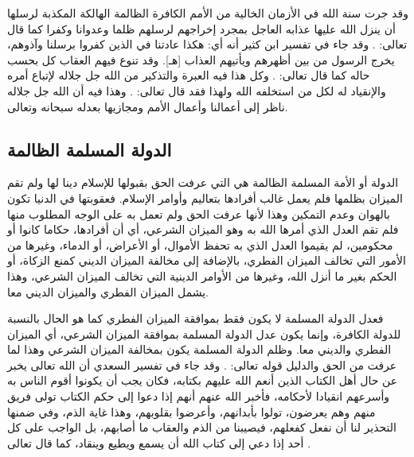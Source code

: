 وقد جرت سنة الله في الأزمان الخالية من الأمم الكافرة الظالمة الهالكة المكذبة لرسلها أن ينزل الله عليها عذابه العاجل بمجرد إخراجهم لرسلهم ظلما وعدوانا وكفرا كما قال تعالى:  
\quranayah*[17][77]{\footnotesize \surahname*[17]}. وقد جاء في تفسير ابن كثير أنه أي: هكذا عادتنا في الذين كفروا برسلنا وآذوهم، يخرج الرسول من بين أظهرهم ويأتيهم العذاب [هـ]. وقد تنوع فيهم العقاب كل بحسب حاله كما قال تعالى: 
\quranayah*[29][40]{\footnotesize \surahname*[29]}. وكل هذا فيه العبرة والتذكير من الله جل جلاله لإتباع أمره والإنقياد له لكل من استخلفه الله ولهذا فقد قال تعالى:
\quranayah*[10][13-14]{\footnotesize \surahname*[10]}.
وهذا فيه أن الله جل جلاله ناظر إلى أعمالنا وأعمال الأمم ومجازيها بعدله سبحانه وتعالى.

\subsection{الدولة المسلمة الظالمة}

الدولة أو الأمة المسلمة الظالمة هي التي عرفت الحق بقبولها للإسلام دينا لها ولم تقم الميزان بظلمها فلم يعمل غالب أفرادها بتعاليم وأوامر الإسلام. فعقوبتها في الدنيا تكون بالهوان وعدم التمكين وهذا لأنها عرفت الحق ولم تعمل به على الوجه المطلوب منها فلم تقم العدل الذي أمرها الله به وهو الميزان الشرعي، أي أن أفرادها، حكاما كانوا أو محكومين، لم يقيموا العدل الذي به تحفظ الأموال، أو الأعراض، أو الدماء، وغيرها من الأمور التي تخالف الميزان الفطري، بالإضافة إلى مخالفة الميزان الديني كمنع الزكاة، أو الحكم بغير ما أنزل الله، وغيرها من الأوامر الدينية التي تخالف الميزان الشرعي، وهذا يشمل الميزان الفطري والميزان الديني معا.

فعدل الدولة المسلمة لا يكون فقط بموافقة الميزان الفطري كما هو الحال بالنسبة للدولة الكافرة، وإنما يكون عدل الدولة المسلمة بموافقة الميزان الشرعي، أي الميزان الفطري والديني معا. وظلم الدولة المسلمة يكون بمخالفة الميزان الشرعي وهذا لما عرفت من الحق والدليل قوله تعالى: 
\quranayah*[3][23]{\footnotesize \surahname*[3]}. وقد جاء في تفسير السعدي أن الله تعالى يخبر عن حال أهل الكتاب الذين أنعم الله عليهم بكتابه، فكان يجب أن يكونوا أقوم الناس به وأسرعهم انقيادا لأحكامه، فأخبر الله عنهم أنهم إذا دعوا إلى حكم الكتاب تولى فريق منهم وهم يعرضون، تولوا بأبدانهم، وأعرضوا بقلوبهم، وهذا غاية الذم، وفي ضمنها التحذير لنا أن نفعل كفعلهم، فيصيبنا من الذم والعقاب ما أصابهم، بل الواجب على كل أحد إذا دعي إلى كتاب الله أن يسمع ويطيع وينقاد، كما قال تعالى \quranayah*[24][51]{\footnotesize \surahname*[24]} \cite{tafsir_Saadi}.


